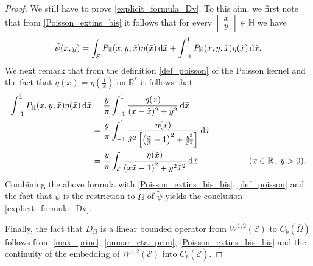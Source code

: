 \documentclass{amsart} %
\numberwithin{equation}{section}
\theoremstyle{definition}
\begin{document}
\begin{proof}
We still have to prove \eqref{explicit_formula_Dv}. To this aim, we first note that from  \eqref{Poisson_extins_bis}
 it follows that for every
$\begin{bmatrix} x\\ y\end{bmatrix}\in \mathbb{H}$ we have
\begin{equation}\label{Poisson_extins_bis_bis}
\tilde\psi(x,y)= \int_\mathcal{E} P_\mathbb{H} (x,y,\tilde x) \eta(\tilde x)\, {\rm d}\tilde x +\int_{-1}^1 P_\mathbb{H} (x,y,\tilde x) \eta(\tilde x)\, {\rm d}\tilde x  .
\end{equation}
We next remark that from the definition \eqref{def_poisson} of the Poisson kernel and the fact that $\eta(x)=\eta \left(\frac1x\right)$ on $\mathbb{R}^*$
it follows that
\begin{equation*}
\begin{aligned}
\int_{-1}^1 P_\mathbb{H} (x,y,\tilde x) \eta(\tilde x)\, {\rm d}\tilde x&=\frac{y}{\pi}\int_{-1}^1\frac{\eta(\tilde x)}{(x-\tilde x)^2+y^2}\, {\rm d}\tilde x \\
&=\frac{y}{\pi}\int_{-1}^1\frac{\eta(\tilde x)}{{\tilde x}^2\left[\left(\frac{x}{\tilde x}-1\right)^2+\frac{y^2}{\tilde x^2}\right]}\, {\rm d}\tilde x\\
&=\frac{y}{\pi}\int_\mathcal{E}\frac{\eta(\tilde x)}{\left(x \tilde x-1\right)^2+ y^2 \tilde x^2}\, {\rm d}\tilde x   \qquad\qquad\qquad(x\in \mathbb{R},\ y>0).
\end{aligned}
\end{equation*}
Combining the above formula with \eqref{Poisson_extins_bis_bis}, \eqref{def_poisson} and the fact that $\psi$ is the restriction to $\overline\Omega$ of
$\tilde\psi$ yields the conclusion \eqref{explicit_formula_Dv}.

Finally, the fact that $D_\Omega$ is a linear bounded operator from $W^{1,2}(\mathcal{E})$ to $C_b(\overline\Omega)$ follows from
\eqref{max_princ}, \eqref{numar_eta_prim}, \eqref{Poisson_extins_bis_bis} and the continuity of the embedding of $W^{1,2}(\mathcal{E})$ into
$C_b(\overline{\mathcal{E}})$.
\end{proof}

\end{document}
